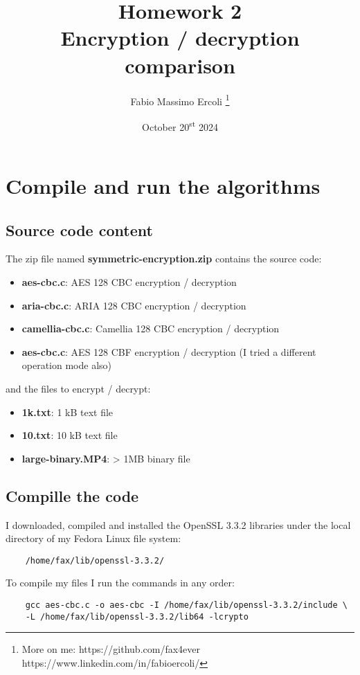 \documentclass{article}
\title{Homework 2 \\
	\large Encryption / decryption comparison}
\author{Fabio Massimo Ercoli
	\footnote{
		More on me:
		https://github.com/fax4ever
		https://www.linkedin.com/in/fabioercoli/
}}
\date{October 20\textsuperscript{st} 2024}
\begin{document}
	
\maketitle
\thispagestyle{empty}

\section{Compile and run the algorithms}

\subsection{Source code content}

The zip file named \textbf{symmetric-encryption.zip} contains the source code:
\begin{itemize}
	\item \textbf{aes-cbc.c}: AES 128 CBC encryption / decryption
	\item \textbf{aria-cbc.c}: ARIA 128 CBC encryption / decryption
	\item \textbf{camellia-cbc.c}: Camellia 128 CBC encryption / decryption
	\item \textbf{aes-cbc.c}: AES 128 CBF encryption / decryption (I tried a different operation mode also)
\end{itemize}

and the files to encrypt / decrypt:

\begin{itemize}
	\item \textbf{1k.txt}: 1 kB text file
	\item \textbf{10.txt}: 10 kB text file
	\item \textbf{large-binary.MP4}: > 1MB binary file
\end{itemize}

\subsection{Compille the code}

I downloaded, compiled and installed the OpenSSL 3.3.2 libraries under the local directory of my Fedora Linux file system:
\begin{verbatim}
	/home/fax/lib/openssl-3.3.2/
\end{verbatim}	

To compile my files I run the commands in any order:

\begin{verbatim}
	gcc aes-cbc.c -o aes-cbc -I /home/fax/lib/openssl-3.3.2/include \
	-L /home/fax/lib/openssl-3.3.2/lib64 -lcrypto
\end{verbatim}
\end{document}
